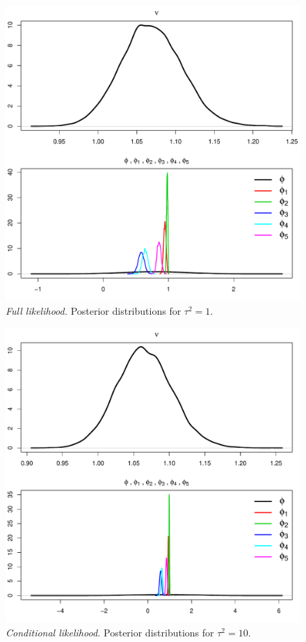 \documentclass[12pt]{article}
\begin{document}
\begin{figure}[H]
\begin{center}
\includegraphics[scale=0.45]{figs/posts_2b.pdf}
\end{center}
\caption{\emph{Full likelihood.} Posterior distributions for $\tau^2=1$.}
\label{posts2b}
\end{figure}

\begin{figure}[H]
\begin{center}
\includegraphics[scale=0.45]{figs/posts_1c.pdf}
\end{center}
\caption{\emph{Conditional likelihood.} Posterior distributions for $\tau^2=10$.}
\label{posts1c}
\end{figure}
\end{document}
